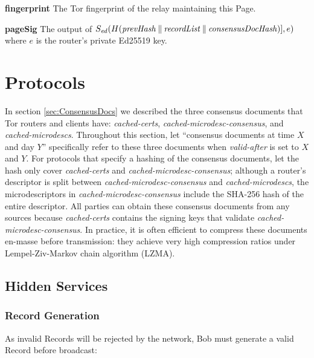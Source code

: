 \textbf{fingerprint} The Tor fingerprint of the relay maintaining this Page.

\textbf{pageSig} The output of $ S_{\mathit{ed}}(H(\mathit{prevHash} \mathbin{\|} \mathit{recordList} \mathbin{\|} \mathit{consensusDocHash})], e) $ where $ e $ is the router's private Ed25519 key.

\section{Protocols}
\label{sec:Protocols}

In section \ref{sec:ConsensusDocs} we described the three consensus documents that Tor routers and clients have: \emph{cached-certs}, \emph{cached-microdesc-consensus}, and \emph{cached-microdescs}. Throughout this section, let ``consensus documents at time $ X $ and day $ Y $'' specifically refer to these three documents when \emph{valid-after} is set to $ X $ and $ Y $. For protocols that specify a hashing of the consensus documents, let the hash only cover \emph{cached-certs} and \emph{cached-microdesc-consensus}; although a router's descriptor is split between \emph{cached-microdesc-consensus} and \emph{cached-microdescs}, the microdescriptors in \emph{cached-microdesc-consensus} include the SHA-256 hash of the entire descriptor. All parties can obtain these consensus documents from any sources because \emph{cached-certs} contains the signing keys that validate \emph{cached-microdesc-consensus}. In practice, it is often efficient to compress these documents en-masse before transmission: they achieve very high compression ratios under Lempel-Ziv-Markov chain algorithm (LZMA).

\subsection{Hidden Services}
\label{sec:ProtoHiddenServices}

\subsubsection{Record Generation}

As invalid Records will be rejected by the network, Bob must generate a valid Record before broadcast:

